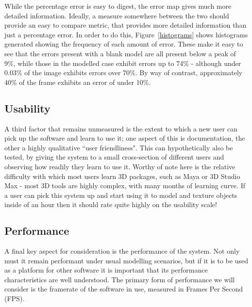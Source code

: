 \documentclass[a4paper,10pt]{article}
\begin{document}
While the percentage error is easy to digest, the error map gives much more detailed information. Ideally, a measure somewhere between the two should provide an easy to compare metric, that provides more detailed information than just a percentage error. In order to do this, Figure~\ref{histograms} shows histograms generated showing the frequency of each amount of error. These make it easy to see that the errors present with a blank model are all present below a peak of 9\%, while those in the modelled case exhibit errors up to 74\% - although under 0.03\% of the image exhibits errors over 70\%. By way of contrast, approximately 40\% of the frame exhibits an error of under 10\%.


\subsection{Usability}
A third factor that remains unmeasured is the extent to which a new user can pick up the software and learn to use it; one aspect of this is documentation, the other a highly qualitative ``user friendliness". This can hypothetically also be tested, by giving the system to a small cross-section of different users and observing how readily they learn to use it. Worthy of note here is the relative difficulty with which most users learn 3D packages, such as Maya or 3D Studio Max - most 3D tools are highly complex, with many months of learning curve. If a user can pick this system up and start using it to model and texture objects inside of an hour then it should rate quite highly on the usability scale!

\subsection{Performance}
A final key aspect for consideration is the performance of the system. Not only must it remain performant under usual modelling scenarios, but if it is to be used as a platform for other software it is important that its performance characteristics are well understood. The primary form of performance we will consider is the framerate of the software in use, measured in Frames Per Second (FPS). 
\end{document}
